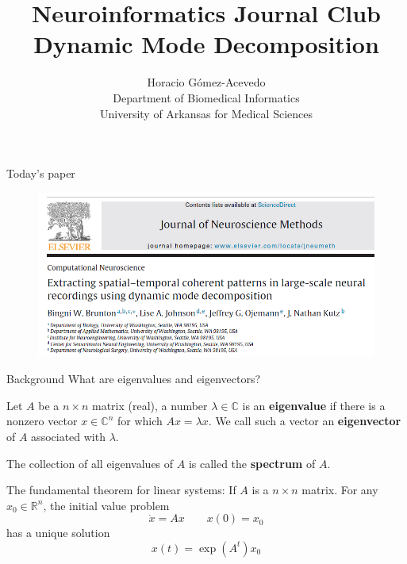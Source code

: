 \documentclass{beamer}
\title{Neuroinformatics Journal Club\\ Dynamic Mode Decomposition }
\author{Horacio G\'omez-Acevedo\\ Department of Biomedical Informatics\\
	University of Arkansas for Medical Sciences}
\begin{document}
	\begin{frame}[plain]
		\maketitle
	\end{frame}
	
	\begin{frame}{Today's paper}
		\begin{figure}[h]
			\centering
				\includegraphics[scale=0.45]{../Figures/fig_brunton_paper.png}
		\end{figure}
	\end{frame}
	
	
\begin{frame}{Background}
What are eigenvalues and eigenvectors?

Let $A$ be a $n\times n$ matrix  (real), a number $\lambda \in \mathbb{C}$ is an \textbf{eigenvalue} if there is a nonzero vector $x \in \mathbb{C}^n$ for which $Ax= \lambda x$. We call such a vector an \textbf{eigenvector} of $A$ associated with $\lambda$. 

The collection of all eigenvalues of $A$ is called the \textbf{spectrum} of $A$.

The fundamental theorem for linear systems: If $A$ is a $n\times n$ matrix. For any $x_0 \in \mathbb{R}^n$, the initial value problem 
\begin{equation*}
	\dot{x}=A x \qquad x(0)=x_0
\end{equation*}
has a unique solution
\begin{equation*}
	x(t)= \exp(A^t)x_0
\end{equation*}

\end{frame}
\end{document}
